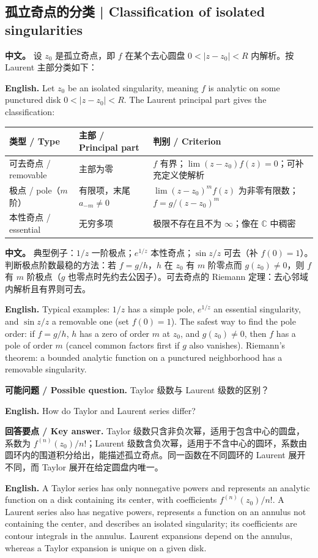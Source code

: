 \documentclass[UTF8,11pt,a4paper]{ctexart}
\newcommand{\EN}[1]{\par\noindent \textbf{English.} #1\par}
\newcommand{\ASK}[4]{\par\noindent \textbf{可能问题 / Possible question.} #1\par\EN{#2}\noindent \textbf{回答要点 / Key answer.} #3\par\EN{#4}\medskip}
\newcommand{\APS}[2]{\par\noindent\textbf{中文。} #1\par\noindent\textbf{English.} #2\par\smallskip}
\begin{document}
\subsection{孤立奇点的分类 | Classification of isolated singularities}
\APS{设 $z_0$ 是孤立奇点，即 $f$ 在某个去心圆盘 $0<|z-z_0|<R$ 内解析。按 Laurent 主部分类如下：}{Let $z_0$ be an isolated singularity, meaning $f$ is analytic on some punctured disk $0<|z-z_0|<R$. The Laurent principal part gives the classification:}
\begin{center}
\small
\begin{tabular}{p{4.3cm}p{3.9cm}p{7.0cm}}
\hline
类型 / Type & 主部 / Principal part & 判别 / Criterion \\
\hline
可去奇点 / removable & 主部为零 & $f$ 有界；$\lim(z-z_0)f(z)=0$；可补充定义使解析 \\
极点 / pole（$m$ 阶） & 有限项，末尾 $a_{-m}\ne0$ & $\lim(z-z_0)^mf(z)$ 为非零有限数；$f=g/(z-z_0)^m$ \\
本性奇点 / essential & 无穷多项 & 极限不存在且不为 $\infty$；像在 $\mathbb C$ 中稠密 \\
\hline
\end{tabular}
\end{center}
\APS{典型例子：$1/z$ 一阶极点；$e^{1/z}$ 本性奇点；$\sin z/z$ 可去（补 $f(0)=1$）。判断极点阶数最稳的方法：若 $f=g/h$，$h$ 在 $z_0$ 有 $m$ 阶零点而 $g(z_0)\ne0$，则 $f$ 有 $m$ 阶极点（$g$ 也零点时先约去公因子）。可去奇点的 Riemann 定理：去心邻域内解析且有界则可去。}{Typical examples: $1/z$ has a simple pole, $e^{1/z}$ an essential singularity, and $\sin z/z$ a removable one (set $f(0)=1$). The safest way to find the pole order: if $f=g/h$, $h$ has a zero of order $m$ at $z_0$, and $g(z_0)\ne0$, then $f$ has a pole of order $m$ (cancel common factors first if $g$ also vanishes). Riemann's theorem: a bounded analytic function on a punctured neighborhood has a removable singularity.}
\ASK{Taylor 级数与 Laurent 级数的区别？}{How do Taylor and Laurent series differ?}{Taylor 级数只含非负次幂，适用于包含中心的圆盘，系数为 $f^{(n)}(z_0)/n!$；Laurent 级数含负次幂，适用于不含中心的圆环，系数由圆环内的围道积分给出，能描述孤立奇点。同一函数在不同圆环的 Laurent 展开不同，而 Taylor 展开在给定圆盘内唯一。}{A Taylor series has only nonnegative powers and represents an analytic function on a disk containing its center, with coefficients $f^{(n)}(z_0)/n!$. A Laurent series also has negative powers, represents a function on an annulus not containing the center, and describes an isolated singularity; its coefficients are contour integrals in the annulus. Laurent expansions depend on the annulus, whereas a Taylor expansion is unique on a given disk.}
\end{document}

